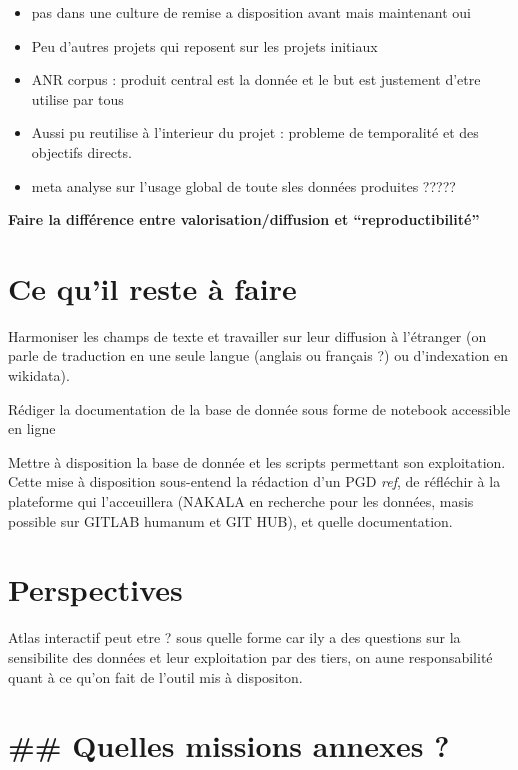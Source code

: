\documentclass[
  12pt,
  a4paperpaper,
]{book}
\providecommand{\tightlist}{%
  \setlength{\itemsep}{0pt}\setlength{\parskip}{0pt}}\usepackage{longtable,booktabs,array}
\begin{document}
\begin{itemize}
\tightlist
\item
  pas dans une culture de remise a disposition avant mais maintenant oui
\item
  Peu d'autres projets qui reposent sur les projets initiaux
\item
  ANR corpus : produit central est la donnée et le but est justement
  d'etre utilise par tous
\item
  Aussi pu reutilise à l'interieur du projet : probleme de temporalité
  et des objectifs directs.
\item
  meta analyse sur l'usage global de toute sles données produites ?????
\end{itemize}

\textbf{Faire la différence entre valorisation/diffusion et
``reproductibilité''}

\hypertarget{ce-quil-reste-uxe0-faire}{%
\section{Ce qu'il reste à faire}\label{ce-quil-reste-uxe0-faire}}

Harmoniser les champs de texte et travailler sur leur diffusion à
l'étranger (on parle de traduction en une seule langue (anglais ou
français ?) ou d'indexation en wikidata).

Rédiger la documentation de la base de donnée sous forme de notebook
accessible en ligne

Mettre à disposition la base de donnée et les scripts permettant son
exploitation. Cette mise à disposition sous-entend la rédaction d'un PGD
\emph{ref}, de réfléchir à la plateforme qui l'acceuillera (NAKALA en
recherche pour les données, masis possible sur GITLAB humanum et GIT
HUB), et quelle documentation.

\hypertarget{perspectives}{%
\section{Perspectives}\label{perspectives}}

Atlas interactif peut etre ? sous quelle forme car ily a des questions
sur la sensibilite des données et leur exploitation par des tiers, on
aune responsabilité quant à ce qu'on fait de l'outil mis à dispositon.

\hypertarget{quelles-missions-annexes}{%
\section{\#\# Quelles missions annexes
?}\label{quelles-missions-annexes}}
\end{document}
